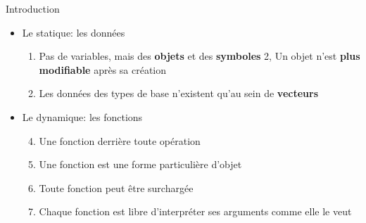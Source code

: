 \documentclass[
  ignorenonframetext,
]{beamer}
\providecommand{\tightlist}{%
  \setlength{\itemsep}{0pt}\setlength{\parskip}{0pt}}
\begin{document}
\begin{frame}{Introduction}
\protect\hypertarget{introduction-1}{}
\begin{itemize}
\tightlist
\item
  Le statique: les données

  \begin{enumerate}
  \tightlist
  \item
    Pas de variables, mais des \textbf{objets} et des \textbf{symboles}
    2, Un objet n'est \textbf{plus modifiable} après sa création
  \item
    Les données des types de base n'existent qu'au sein de
    \textbf{vecteurs}
  \end{enumerate}
\item
  Le dynamique: les fonctions

  \begin{enumerate}
  \setcounter{enumi}{3}
  \tightlist
  \item
    Une fonction derrière toute opération
  \item
    Une fonction est une forme particulière d'objet
  \item
    Toute fonction peut être surchargée
  \item
    Chaque fonction est libre d'interpréter ses arguments comme elle le
    veut
  \end{enumerate}
\end{itemize}
\end{frame}
\end{document}
